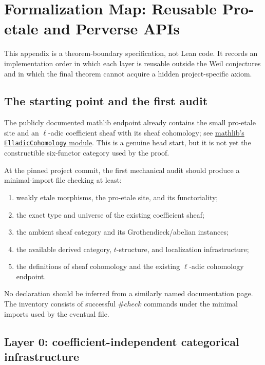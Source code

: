 \chapter{Formalization Map: Reusable Pro-etale and Perverse APIs}
\label{app:proetale-formalization}

This appendix is a theorem-boundary specification, not Lean code.  It records
an implementation order in which each layer is reusable outside the Weil
conjectures and in which the final theorem cannot acquire a hidden
project-specific axiom.

\section{The starting point and the first audit}

The publicly documented mathlib endpoint already contains the small
pro-etale site and an \(\ell\)-adic coefficient sheaf with its sheaf
cohomology; see
\href{https://leanprover-community.github.io/mathlib4_docs/Mathlib/AlgebraicGeometry/Sites/ElladicCohomology.html}
{mathlib's \texttt{ElladicCohomology} module}.
This is a genuine head start, but it is not yet the constructible
six-functor category used by the proof.

At the pinned project commit, the first mechanical audit should produce a
minimal-import file checking at least:

\begin{enumerate}
\item weakly etale morphisms, the pro-etale site, and its functoriality;
\item the exact type and universe of the existing coefficient sheaf;
\item the ambient sheaf category and its Grothendieck/abelian instances;
\item the available derived category, \(t\)-structure, and localization
      infrastructure;
\item the definitions of sheaf cohomology and the existing
      \(\ell\)-adic cohomology endpoint.
\end{enumerate}

No declaration should be inferred from a similarly named documentation page.
The inventory consists of successful \(\#check\) commands under the minimal
imports used by the eventual file.

\section{Layer 0: coefficient-independent categorical infrastructure}

